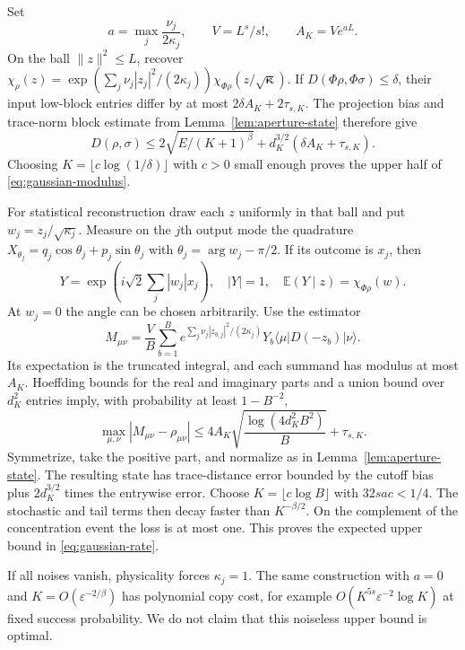 \documentclass[11pt,a4paper]{article}
\numberwithin{equation}{section}
\begin{document}
Set
\[
 a=\max_j\frac{\nu_j}{2\kappa_j},\qquad V=L^s/s!,\qquad A_K=Ve^{aL}.
\]
On the ball $\|z\|^2\le L$, recover
$\chi_\rho(z)=\exp(\sum_j\nu_j|z_j|^2/(2\kappa_j))
\chi_{\Phi\rho}(z/\sqrt{\boldsymbol\kappa})$.
If $D(\Phi\rho,\Phi\sigma)\le\delta$, their input low-block entries differ
by at most $2\delta A_K+2\tau_{s,K}$. The projection bias and trace-norm
block estimate from Lemma~\ref{lem:aperture-state} therefore give
\[
 D(\rho,\sigma)\le2\sqrt{E/(K+1)^\beta}
           +d_K^{3/2}(\delta A_K+\tau_{s,K}).
 \tag{D.8}\label{eq:gaussian-stability-upper}
\]
Choosing $K=\lfloor c\log(1/\delta)\rfloor$ with $c>0$ small enough
proves the upper half of \eqref{eq:gaussian-modulus}.

For statistical reconstruction draw each $z$ uniformly in that ball and put
$w_j=z_j/\sqrt{\kappa_j}$. Measure on the $j$th output mode the quadrature
$X_{\theta_j}=q_j\cos\theta_j+p_j\sin\theta_j$ with
$\theta_j=\arg w_j-\pi/2$. If its outcome is $x_j$, then
\[
 Y=\exp\!\left(i\sqrt2\sum_j|w_j|x_j\right),
 \quad |Y|=1,\quad \mathbb E(Y\mid z)=\chi_{\Phi\rho}(w).
\]
At $w_j=0$ the angle can be chosen arbitrarily. Use the estimator
\[
 M_{\mu\nu}=\frac V B\sum_{b=1}^B
 e^{\sum_j\nu_j|z_{b,j}|^2/(2\kappa_j)}Y_b
                   \langle\mu|D(-z_b)|\nu\rangle.
 \tag{D.9}\label{eq:gaussian-homodyne-estimator}
\]
Its expectation is the truncated integral, and each summand has modulus at
most $A_K$. Hoeffding bounds for the real and imaginary parts and a union
bound over $d_K^2$ entries imply, with probability at least $1-B^{-2}$,
\[
 \max_{\mu,\nu}|M_{\mu\nu}-\rho_{\mu\nu}|
 \le4A_K\sqrt{\frac{\log(4d_K^2B^2)}B}+\tau_{s,K}.
 \tag{D.10}\label{eq:gaussian-statistical-error}
\]
Symmetrize, take the positive part, and normalize as in
Lemma~\ref{lem:aperture-state}. The resulting state has trace-distance
error bounded by the cutoff bias plus $2d_K^{3/2}$ times the entrywise
error. Choose $K=\lfloor c\log B\rfloor$ with $32sac<1/4$.
The stochastic and tail terms then decay faster than $K^{-\beta/2}$.
On the complement of the concentration event the loss is at most one.
This proves the expected upper bound in \eqref{eq:gaussian-rate}.

If all noises vanish, physicality forces $\kappa_j=1$. The same construction
with $a=0$ and $K=O(\varepsilon^{-2/\beta})$ has polynomial copy cost,
for example $O(K^{5s}\varepsilon^{-2}\log K)$ at fixed success probability.
We do not claim that this noiseless upper bound is optimal.
\end{document}
